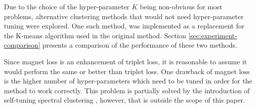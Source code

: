 Due to the choice of the hyper-parameter \( K \) being non-obvious for most problems, alternative clustering methods that would not need hyper-parameter tuning were explored. One such method,  \cite{zelnik-manor_self-tuning_2005} was implemented as a replacement for the K-means algorithm used in the original method. Section \ref{sec:experiment-comparison} presents a comparison of the performance of these two methods.

Since magnet loss is an enhancement of triplet loss, it is reasonable to assume it would perform the same or better than triplet loss. One drawback of magnet loss is the higher number of hyper-parameters which need to be tuned in order for the method to work correctly. This problem is partially solved by the introduction of self-tuning spectral clustering \cite{zelnik-manor_self-tuning_2005}, however, that is outside the scope of this paper.
